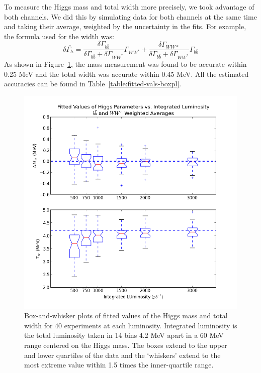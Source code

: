 \documentclass[a4paper]{article}
\begin{document}
To measure the Higgs mass and total width more precisely, we took advantage of both channels. We did this by simulating data for both channels at the same time and taking their average, weighted by the uncertainty in the fits. For example, the formula used for the width was:
\begin{equation}
	\delta \overline{\Gamma_h} = \frac{\delta \Gamma_{b\bar{b}}}{\delta \Gamma_{b\bar{b}} + \delta \Gamma_{WW^*}}\Gamma_{WW^*} + \frac{\delta \Gamma_{WW*}}{\delta \Gamma_{b\bar{b}} + \delta \Gamma_{WW^*}}\Gamma_{b\bar{b}}\label{eq:weight-avg}
\end{equation}
As shown in Figure~\ref{fig:fitted-vals-boxpl-mix}, the mass measurement was found to be accurate within 0.25 MeV and the total width was accurate within 0.45 MeV. All the estimated accuracies can be found in Table~\ref{table:fitted-vals-boxpl}.

\begin{figure}
	\includegraphics[width=\textwidth]{fitted-vals-boxpl-mix}
	\caption{Box-and-whisker plots of fitted values of the Higgs mass and total width for 40 experiments at each luminosity. Integrated luminosity is the total luminosity taken in 14 bins 4.2 MeV apart in a 60 MeV range centered on the Higgs mass. The boxes extend to the upper and lower quartiles of the data and the `whiskers' extend to the most extreme value within 1.5 times the inner-quartile range.\label{fig:fitted-vals-boxpl-mix}}
\end{figure}
\end{document}
